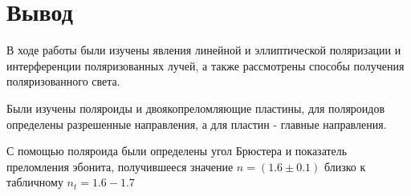 \documentclass[15pt,a5paper,reqno]{article}
\begin{document}
\section{Вывод}
В ходе работы были изучены явления линейной и эллиптической поляризации и интерференции поляризованных лучей, а также рассмотрены способы получения поляризованного света.

Были изучены поляроиды и двоякопреломляющие пластины, для поляроидов определены разрешенные направления, а для пластин - главные направления.

С помощью поляроида были определены угол Брюстера и показатель преломления эбонита, получившееся значение $n = (1.6 \pm 0.1)$ близко к табличному $n_t = 1.6-1.7$
\end{document}

